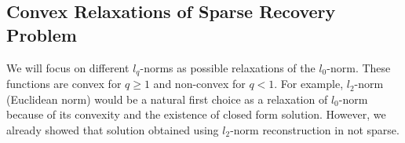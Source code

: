 \documentclass[journal]{IEEEtran}
\begin{document}
\subsection{Convex Relaxations of Sparse Recovery Problem}


We will focus on different $l_q$-norms as possible relaxations of the $l_0$-norm. These functions are convex for $q\geq 1$ and non-convex for $q<1$. For example, $l_2$-norm (Euclidean norm) would be a natural first choice as a relaxation of $l_0$-norm because of its convexity and the existence of closed form solution. However, we already showed that solution obtained using $l_2$-norm reconstruction in not sparse.
%
%
%
\end{document}
